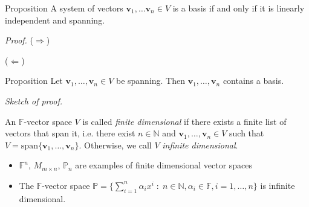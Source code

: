 \documentclass [aspectratio=169]{beamer}
\newcommand{\bv}{{\mathbf{v}}}
\newcommand{\N}{{\mathbb{N}}}
\newcommand{\F}{{\mathbb{F}}}
\begin{document}
\begin{frame}
\begin{exampleblock}{Proposition}
 A system of vectors $\bv_1, \ldots \bv_n \in V$ is a basis if and only if it is linearly independent and spanning.
 \end{exampleblock}
\textit{Proof.}
($\Rightarrow$)
\vspace{4cm}

\end{frame}


\begin{frame}
($\Leftarrow$)
\vspace{6.5cm}

\end{frame}


\begin{frame}
\begin{exampleblock}{Proposition}
 Let $\bv_1,\ldots, \bv_n\in V$ be spanning. Then $\bv_1,\ldots, \bv_n$ contains a basis.
 \end{exampleblock}
 
 \vspace{1em}
 
\textit{Sketch of proof.}
\vspace{4cm}

\end{frame}



\begin{frame}
\begin{definition}
An $\F$-vector space $V$ is called \emph{finite dimensional} if there exists a finite list of vectors that span it, i.e. there exist $n\in \N$ and $\bv_1,\ldots, \bv_n\in V$ such that $V= \mathrm{span}\{\bv_1,\ldots,\bv_n\}$. Otherwise, we call $V$ \emph{infinite dimensional}.
\end{definition}

\begin{example}
\begin{itemize}
    \item $\F^n$, $M_{m\times n}$, $\mathbb{P}_n$ are examples of finite dimensional vector spaces
    \item The $\F$-vector space $\mathbb{P} = \{ \sum_{i=1}^n \alpha_i x^i  \; \colon \; n\in \N, \alpha_i \in \F, i=1,\ldots,n\}$ is infinite dimensional. 
\end{itemize}
\end{example}
\vspace{2.5cm}
\end{frame}
\end{document}
